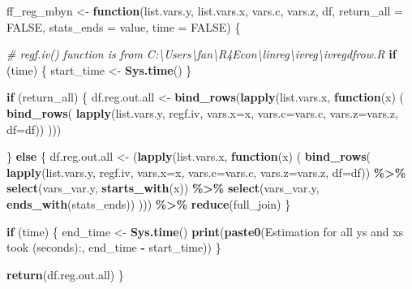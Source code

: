 \documentclass[
]{book}
\newenvironment{Shaded}{\begin{snugshade}}{\end{snugshade}}
\newcommand{\CommentTok}[1]{\textcolor[rgb]{0.56,0.35,0.01}{\textit{#1}}}
\newcommand{\ControlFlowTok}[1]{\textcolor[rgb]{0.13,0.29,0.53}{\textbf{#1}}}
\newcommand{\DataTypeTok}[1]{\textcolor[rgb]{0.13,0.29,0.53}{#1}}
\newcommand{\KeywordTok}[1]{\textcolor[rgb]{0.13,0.29,0.53}{\textbf{#1}}}
\newcommand{\NormalTok}[1]{#1}
\newcommand{\OperatorTok}[1]{\textcolor[rgb]{0.81,0.36,0.00}{\textbf{#1}}}
\newcommand{\OtherTok}[1]{\textcolor[rgb]{0.56,0.35,0.01}{#1}}
\newcommand{\StringTok}[1]{\textcolor[rgb]{0.31,0.60,0.02}{#1}}
\begin{document}
\begin{Shaded}
\begin{Highlighting}[]
\NormalTok{ff\_reg\_mbyn \textless{}{-}}\StringTok{ }\ControlFlowTok{function}\NormalTok{(list.vars.y, list.vars.x,}
\NormalTok{                        vars.c, vars.z, df,}
                        \DataTypeTok{return\_all =} \OtherTok{FALSE}\NormalTok{,}
                        \DataTypeTok{stats\_ends =} \StringTok{\textquotesingle{}value\textquotesingle{}}\NormalTok{, }\DataTypeTok{time =} \OtherTok{FALSE}\NormalTok{) \{}

  \CommentTok{\# regf.iv() function is from C:\textbackslash{}Users\textbackslash{}fan\textbackslash{}R4Econ\textbackslash{}linreg\textbackslash{}ivreg\textbackslash{}ivregdfrow.R}
  \ControlFlowTok{if}\NormalTok{ (time) \{}
\NormalTok{    start\_time \textless{}{-}}\StringTok{ }\KeywordTok{Sys.time}\NormalTok{()}
\NormalTok{  \}}

  \ControlFlowTok{if}\NormalTok{ (return\_all) \{}
\NormalTok{    df.reg.out.all \textless{}{-}}
\StringTok{      }\KeywordTok{bind\_rows}\NormalTok{(}\KeywordTok{lapply}\NormalTok{(list.vars.x,}
                       \ControlFlowTok{function}\NormalTok{(x) (}
                         \KeywordTok{bind\_rows}\NormalTok{(}
                           \KeywordTok{lapply}\NormalTok{(list.vars.y, regf.iv,}
                                  \DataTypeTok{vars.x=}\NormalTok{x, }\DataTypeTok{vars.c=}\NormalTok{vars.c, }\DataTypeTok{vars.z=}\NormalTok{vars.z, }\DataTypeTok{df=}\NormalTok{df))}
\NormalTok{                       )))}

\NormalTok{  \} }\ControlFlowTok{else}\NormalTok{ \{}
\NormalTok{    df.reg.out.all \textless{}{-}}
\StringTok{      }\NormalTok{(}\KeywordTok{lapply}\NormalTok{(list.vars.x,}
              \ControlFlowTok{function}\NormalTok{(x) (}
                \KeywordTok{bind\_rows}\NormalTok{(}
                  \KeywordTok{lapply}\NormalTok{(list.vars.y, regf.iv,}
                         \DataTypeTok{vars.x=}\NormalTok{x, }\DataTypeTok{vars.c=}\NormalTok{vars.c, }\DataTypeTok{vars.z=}\NormalTok{vars.z, }\DataTypeTok{df=}\NormalTok{df)) }\OperatorTok{\%\textgreater{}\%}
\StringTok{                  }\KeywordTok{select}\NormalTok{(vars\_var.y, }\KeywordTok{starts\_with}\NormalTok{(x)) }\OperatorTok{\%\textgreater{}\%}
\StringTok{                  }\KeywordTok{select}\NormalTok{(vars\_var.y, }\KeywordTok{ends\_with}\NormalTok{(stats\_ends))}
\NormalTok{              ))) }\OperatorTok{\%\textgreater{}\%}\StringTok{ }\KeywordTok{reduce}\NormalTok{(full\_join)}
\NormalTok{  \}}

  \ControlFlowTok{if}\NormalTok{ (time) \{}
\NormalTok{    end\_time \textless{}{-}}\StringTok{ }\KeywordTok{Sys.time}\NormalTok{()}
    \KeywordTok{print}\NormalTok{(}\KeywordTok{paste0}\NormalTok{(}\StringTok{\textquotesingle{}Estimation for all ys and xs took (seconds):\textquotesingle{}}\NormalTok{,}
\NormalTok{                 end\_time }\OperatorTok{{-}}\StringTok{ }\NormalTok{start\_time))}
\NormalTok{  \}}

  \KeywordTok{return}\NormalTok{(df.reg.out.all)}
\NormalTok{\}}
\end{Highlighting}
\end{Shaded}
\end{document}

